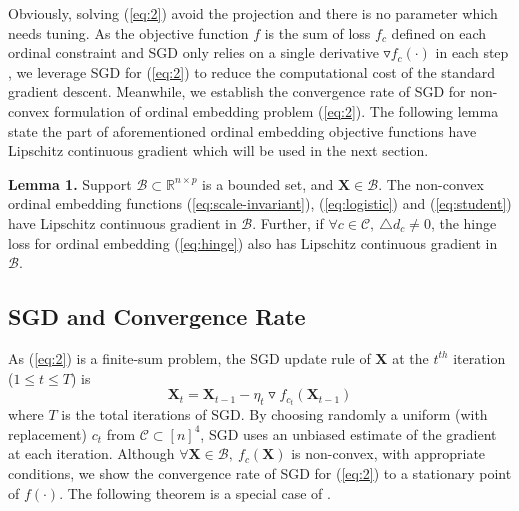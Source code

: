 \documentclass[letterpaper]{article}
\begin{document}
		Obviously, solving (\ref{eq:2}) avoid the projection and there is no parameter which needs tuning. As the objective function $f$ is the sum of loss $f_c$ defined on each ordinal constraint and SGD only relies on a single derivative $\triangledown f_c(\cdot)$ in each step , we leverage SGD for (\ref{eq:2}) to reduce the computational cost of the standard gradient descent. Meanwhile, we establish the convergence rate of SGD for non-convex formulation of ordinal embedding problem (\ref{eq:2}). The following lemma state the part of aforementioned ordinal embedding objective functions have Lipschitz continuous gradient which will be used in the next section.

		\textbf{Lemma 1.} Support $\mathcal{B}\subset\mathbb{R}^{n\times p}$ is a bounded set, and $\mathbf{X}\in\mathcal{B}$. The non-convex ordinal embedding functions (\ref{eq:scale-invariant}), (\ref{eq:logistic}) and (\ref{eq:student}) have Lipschitz continuous gradient in $\mathcal{B}$. Further, if $\forall c\in\mathcal{C},\ \triangle d_c\neq 0$, the hinge loss for ordinal embedding (\ref{eq:hinge}) also has Lipschitz continuous gradient in $\mathcal{B}$.


		\subsection{SGD and Convergence Rate}

		As (\ref{eq:2}) is a finite-sum problem, the SGD update rule of $\mathbf{X}$ at the $t^{th}$ iteration ($1\leq t\leq T$) is
		\begin{equation}
			\label{eq:3}
			\mathbf{X}_{t} = \mathbf{X}_{t-1}-\eta_{t}\triangledown f_{c_t}(\mathbf{X}_{t-1})
		\end{equation}
		where $T$ is the total iterations of SGD. By choosing randomly a uniform (with replacement) $c_t$ from $\mathcal{C}\subset[n]^4$, SGD uses an unbiased estimate of the gradient at each iteration. Although $\forall \mathbf{X}\in\mathcal{B},\ f_c(\mathbf{X})$ is non-convex, with appropriate conditions, we show the convergence rate of SGD for (\ref{eq:2}) to a stationary point of $f(\cdot)$. The following theorem is a special case of \cite{ghadimi2013stochastic}.
\end{document}
